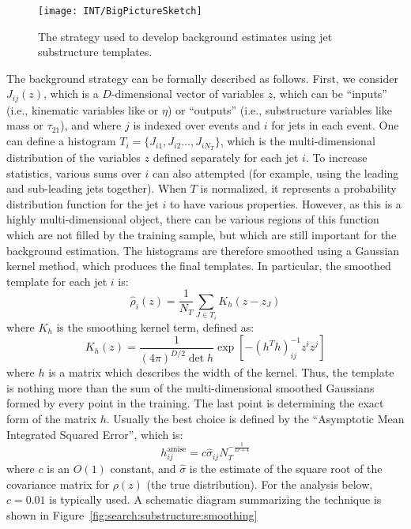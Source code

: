 
\begin{figure}
\centering
\texttt{[image: INT/BigPictureSketch]}
\label{fig:search:substructure:template-big-picture}
\caption{The strategy used to develop background estimates using jet substructure templates.}
\end{figure}


The background strategy can be formally described as follows. First, we consider $J_{ij}(z)$, which is a $D$-dimensional vector of variables $z$, which can be ``inputs'' (i.e., kinematic variables like \pt or $\eta$) or ``outputs'' (i.e., substructure variables like mass or $\tau_{21}$), and where $j$ is indexed over events and $i$ for jets in each event. One can define a histogram $T_i = \{J_{i1}, J_{i2}..., J_{iN_T}\}$, which is the multi-dimensional distribution of the variables $z$ defined separately for each jet $i$. To increase statistics, various sums over $i$ can also attempted (for example, using the leading and sub-leading jets together). When $T$ is normalized, it represents a probability distribution function for the jet $i$ to have various properties. However, as this is a highly multi-dimensional object, there can be various regions of this function which are not filled by the training sample, but which are still important for the background estimation. The histograms are therefore smoothed using a Gaussian kernel method, which produces the final templates. In particular, the smoothed template for each jet $i$ is:
%
\begin{equation}
\hat{\rho}_i(z) = \frac{1}{N_T} \sum_{J\in T_i} K_h(z - z_J)
\end{equation}
%
where $K_h$ is the smoothing kernel term, defined as:
%
\begin{equation}
K_h(z) = \frac{1}{(4\pi)^{D/2} \det h} \exp \left[ - \left(h^T h \right)^{-1}_{ij} z^i z^j \right]
\end{equation}
% 
where $h$ is a matrix which describes the width of the kernel. Thus, the template is nothing more than the sum of the multi-dimensional smoothed Gaussians formed by every point in the training. The last point is determining the exact form of the matrix $h$. Usually the best choice is defined by the ``Asymptotic Mean Integrated Squared Error'', which is:
%
\begin{equation}
h_{ij}^\mathrm{amise} = c \hat{\sigma}_{ij} N_T^{-\frac{1}{D+4}}
\end{equation}
%
where $c$ is an $O(1)$ constant, and $\hat{\sigma}$ is the estimate of the square root of the covariance matrix for $\rho(z)$ (the true distribution). For the analysis below, $c=0.01$ is typically used. A schematic diagram summarizing the technique is shown in Figure~\ref{fig:search:substructure:smoothing}

